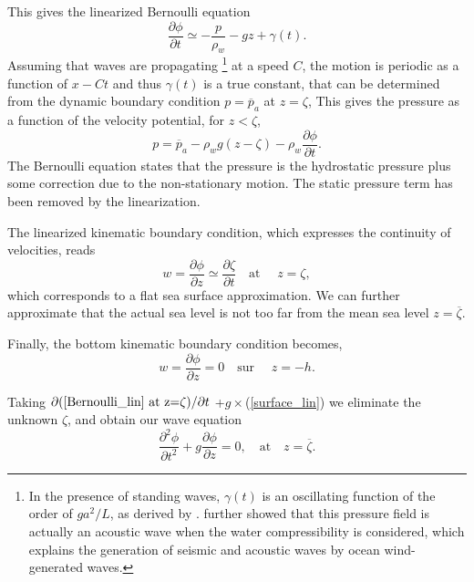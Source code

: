 This gives the linearized Bernoulli equation
\begin{equation}
    \frac{\partial \phi}{\partial t} \simeq 
       -\frac{p}{\rho_w}-g z + \gamma(t).\label{Bernoulli_lin}
\end{equation}
Assuming that waves are propagating \footnote{In the presence of standing waves, $\gamma(t)$ 
is an oscillating function of the order of $g a^2/L$, as derived by \cite{Miche1944d}.  \cite{Longuet-Higgins1950} further showed that this pressure field is actually an acoustic wave when the water compressibility is considered, which explains the generation of seismic and acoustic waves by ocean wind-generated waves.} at a speed $C$, the motion is periodic as a function of $x-C t$ and thus $\gamma(t)$ is a true constant, that can be determined from the dynamic boundary condition $p=\overline{p}_a$ at $z=\zeta$,
This gives the pressure as a function of the velocity potential, for $z< \zeta$, 
\begin{equation}
    p=\overline{p}_a -{\rho_w}g(z-\zeta) 
    -\rho_w \frac{\partial \phi}{\partial t}.\label{p_all}
\end{equation}
The Bernoulli equation states that the pressure is the hydrostatic pressure plus some correction 
due to the non-stationary motion. The static pressure term has been removed by the linearization. 

The linearized kinematic boundary condition, which expresses the continuity of velocities, reads
\begin{equation}
    w = \frac{\partial \phi }{\partial z} \simeq \frac{\partial \zeta}{\partial t}
    \quad \mbox{at\ }\quad z=\zeta,  \label{surface_lin}
\end{equation} which corresponds to a flat sea surface approximation. 
We can further approximate that the actual sea level is not too far from the mean sea level $z=\overline{\zeta}$. 


Finally, the bottom kinematic boundary condition becomes, 
\begin{equation}
    w=\frac{\partial \phi }{\partial z}=0 \quad \mbox{sur\ }\quad z=-h.  \label{bottom}
\end{equation}

Taking  $\partial (\ref{Bernoulli_lin} \textrm{~at z=}\zeta)/\partial t $
+$g\times$(\ref{surface_lin}) we eliminate the unknown $\zeta$, and obtain our 
wave equation 
\begin{equation}
  \frac{\partial^2{\phi}}{\partial{t^2}}+g\frac{\partial\phi}{\partial z}=0, \quad \mbox{at}
\quad  z=\overline{\zeta}. \label{surface 1}
\end{equation}

